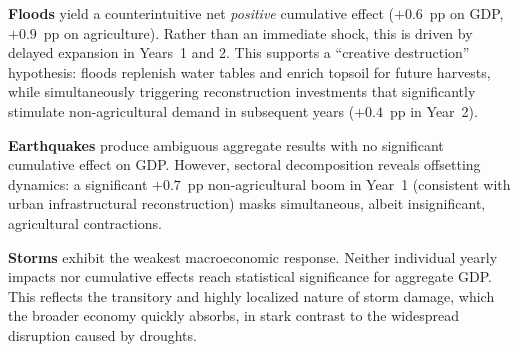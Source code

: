 \documentclass[11pt, a4paper]{article}
\begin{document}
\textbf{Floods} yield a counterintuitive net \textit{positive} cumulative effect ($+0.6$~pp on GDP, $+0.9$~pp on agriculture). Rather than an immediate shock, this is driven by delayed expansion in Years~1 and 2. This supports a ``creative destruction'' hypothesis: floods replenish water tables and enrich topsoil for future harvests, while simultaneously triggering reconstruction investments that significantly stimulate non-agricultural demand in subsequent years ($+0.4$~pp in Year~2).

\textbf{Earthquakes} produce ambiguous aggregate results with no significant cumulative effect on GDP. However, sectoral decomposition reveals offsetting dynamics: a significant $+0.7$~pp non-agricultural boom in Year~1 (consistent with urban infrastructural reconstruction) masks simultaneous, albeit insignificant, agricultural contractions.

\textbf{Storms} exhibit the weakest macroeconomic response. Neither individual yearly impacts nor cumulative effects reach statistical significance for aggregate GDP. This reflects the transitory and highly localized nature of storm damage, which the broader economy quickly absorbs, in stark contrast to the widespread disruption caused by droughts.
\end{document}
